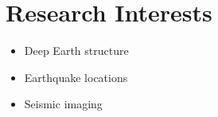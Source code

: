 \section{Research Interests}

\begin{itemize}
\item Deep Earth structure
\item Earthquake locations
\item Seismic imaging
\end{itemize}
